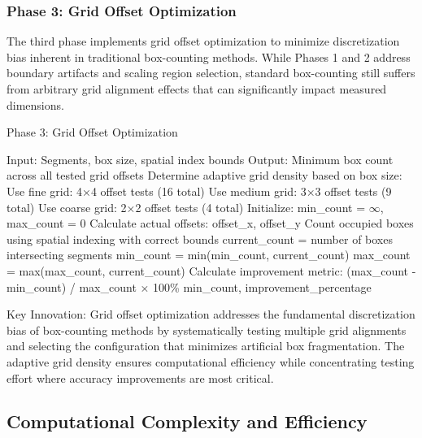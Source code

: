 \documentclass[preprint,12pt]{elsarticle}
\def\textbf#1{#1}%
\begin{document}
\subsubsection{Phase 3: Grid Offset Optimization}

The third phase implements grid offset optimization to minimize discretization bias inherent in traditional box-counting methods. While Phases 1 and 2 address boundary artifacts and scaling region selection, standard box-counting still suffers from arbitrary grid alignment effects that can significantly impact measured dimensions.

\begin{algorithm}[H]
\caption{Phase 3: Grid Offset Optimization}
\begin{algorithmic}[1]
\small
\State \textbf{Input:} Segments, box size, spatial index bounds
\State \textbf{Output:} Minimum box count across all tested grid offsets
\State
\State Determine adaptive grid density based on box size:
    \State Use fine grid: 4×4 offset tests (16 total)
    \State Use medium grid: 3×3 offset tests (9 total)
\Else
    \State Use coarse grid: 2×2 offset tests (4 total)
\EndIf
\State
\State Initialize: min\_count = $\infty$, max\_count = 0
    \State Calculate actual offsets: offset\_x, offset\_y
    \State Count occupied boxes using spatial indexing with correct bounds
    \State current\_count = number of boxes intersecting segments
    \State min\_count = min(min\_count, current\_count)
    \State max\_count = max(max\_count, current\_count)
\EndFor
\State
\State Calculate improvement metric: (max\_count - min\_count) / max\_count × 100\%
\State \Return min\_count, improvement\_percentage
\end{algorithmic}
\end{algorithm}

\textbf{Key Innovation}: Grid offset optimization addresses the fundamental discretization bias of box-counting methods by systematically testing multiple grid alignments and selecting the configuration that minimizes artificial box fragmentation. The adaptive grid density ensures computational efficiency while concentrating testing effort where accuracy improvements are most critical.

\subsection{Computational Complexity and Efficiency}
\end{document}
